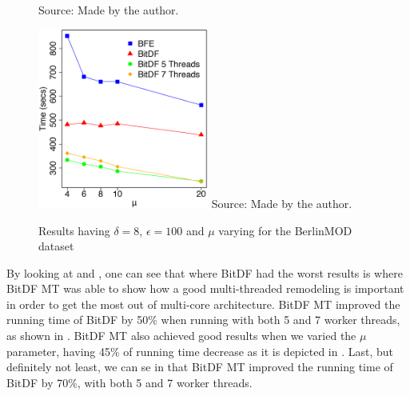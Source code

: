 {\begin{figure}[h!]
\begin{subfigure}[t]{0.49\textwidth}
        \label{fig:berlinmod_complete_vary_g}
    \end{subfigure}
    \footnotesize{Source: Made by the author.}
    \label{fig:berlinmod_complete_results}
\end{figure}

\begin{figure}[h!]
    \centering
    \caption{Results having $\delta = 8$, $\epsilon = 100$ and $\mu$ varying for the BerlinMOD dataset}
    \includegraphics[width=0.5\textwidth]{images/BerlinMOD_complete_varying_n.eps}
    \footnotesize{Source: Made by the author.}
    \label{fig:berlinmod_complete_vary_n}
\end{figure}

By looking at  and , one can see that
where BitDF had the worst results is where BitDF MT was able to show how a good multi-threaded remodeling is important
in order to get the most out of multi-core architecture. BitDF MT improved the running time of BitDF by 50\% when
running with both 5 and 7 worker threads, as shown in . BitDF MT also achieved
good results when we varied the $\mu$ parameter, having 45\% of running time decrease as it is depicted in
. Last, but definitely not least, we can se in
 that BitDF MT improved the running time of BitDF by 70\%, with both 5 and 7
worker threads.

}

